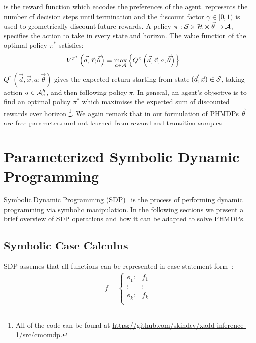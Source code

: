 \documentclass[letterpaper]{article}
\begin{document}
{\footnotesize \RewardFunc} is the reward function which encodes the preferences of the agent. {\footnotesize \Horizon} represents the number of decision steps until termination and the discount factor {\footnotesize $\gamma \in [0, 1)$} is used to geometrically discount future rewards. A policy {\footnotesize $\pi : \mathcal{S} \times \mathcal{H} \times \vec{\theta} \rightarrow \mathcal{A}$}, specifies the action to take in every state and horizon. The value function of the optimal policy {\footnotesize$ \pi^{*} $} satisfies:
{\footnotesize 
    \begin{align}
    \label{eq:opt_vfunc}
    V^{\pi^{*}}\left(\vec{d}, \vec{x}; \vec{\theta}\right) &= \max_{a \in \mathcal{A}} \left\{ Q^{\pi}\left(\vec{d}, \vec{x}, a; \vec{\theta}\right) \right\}.
    \end{align}
}%
{\footnotesize $ Q^{\pi}\left(\vec{d}, \vec{x}, a; \vec{\theta}\right) $} gives the expected return starting from state {\footnotesize $(\vec{d}, \vec{x}) \in \mathcal{S}$}, taking action {\footnotesize $ a \in \mathcal{A}^{h}_{s} $}, and then following policy $ \pi $. In general, an agent's objective is to find an optimal policy {\footnotesize$ \pi^{*} $} which maximises the expected sum of discounted rewards over horizon {\footnotesize \Horizon}\footnote{All of the code can be found at \url{https://github.com/skindev/xadd-inference-1/src/cmomdp}.}. 
We again remark that in our formulation of PHMDPs {\footnotesize $ \vec{\theta} $} are free parameters and not learned from reward and transition samples.

\section{Parameterized Symbolic Dynamic Programming}
\label{sec:sdp}

Symbolic Dynamic Programming (SDP)~\cite{Boutilier_IJCAI_2001} is the process of performing dynamic programming via symbolic manipulation. In the following sections we present a brief overview of SDP operations and how it can be adapted to solve PHMDPs.

\subsection{Symbolic Case Calculus}

SDP assumes that all functions can be represented in case statement form~\cite{Boutilier_IJCAI_2001}:
{\footnotesize 
    \begin{align*}
    f = 
    \begin{cases}
    \phi_1: & f_1 \\ 
    \vdots & \vdots\\ 
    \phi_k: & f_k \\ 
    \end{cases}
    \end{align*}
}%
\end{document}
